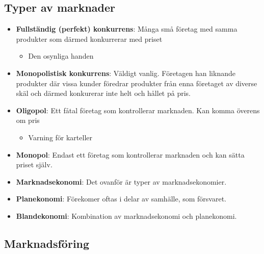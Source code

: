 \begin{multicols}{2}
\subsection{Typer av marknader}
\begin{itemize}
    \item \textbf{Fullständig (perfekt) konkurrens}: \newline
    Många små företag med samma produkter som därmed konkurrerar med priset
    \begin{itemize}
        \item Den osynliga handen
    \end{itemize}
    \item \textbf{Monopolistisk konkurrens}: \newline
    Väldigt vanlig. Företagen han liknande produkter där vissa kunder föredrar 
    produkter från enna företaget av diverse skäl och därmed konkurerar inte helt
    och hållet på pris.
    \item \textbf{Oligopol}: \newline
    Ett fåtal företag som kontrollerar marknaden. Kan komma överens om pris
    \begin{itemize}
        \item Varning för karteller
    \end{itemize}
    \item \textbf{Monopol}: \newline
    Endast ett företag som kontrollerar marknaden och kan sätta priset själv. 
    \item \textbf{Marknadsekonomi}: \newline
    Det ovanför är typer av marknadsekonomier.
    \item \textbf{Planekonomi}: \newline
    Förekomer oftas i delar av samhälle, som försvaret.
    \item \textbf{Blandekonomi}: \newline
    Kombination av marknadsekonomi och planekonomi.
\end{itemize}

\subsection{Marknadsföring}

\end{multicols}
